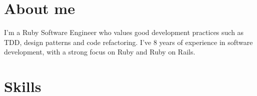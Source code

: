 \documentclass[11pt,a4paper,sans,colorlinks]{moderncv} %
\begin{document}







\newpage


\makecvtitle %

\section{About me}
  I'm a Ruby Software Engineer who values good development practices such as TDD, design patterns and code refactoring.
  I've 8 years of experience in software development, with a strong focus on Ruby and Ruby on Rails.
\section{Skills}
\end{document}

